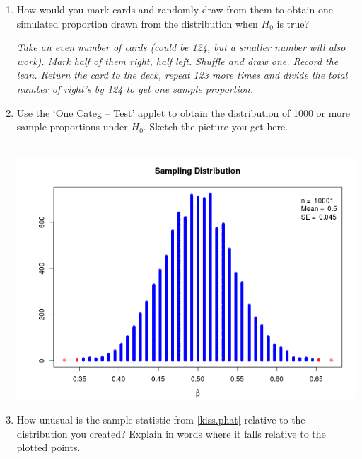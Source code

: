 \begin{enumerate}
\begin{enumerate}
\begin{enumerate}
\begin{key} 
{\it $p = .5$.  Half of all couples lean right when kissing.}
\end{key}
$H_a:$
\begin{students}
    \vspace{1cm}    \\
\end{students}
\begin{key} 
{\it $p \neq .5$.  The true proportion of couples leaning right when
  kissing is not one half.}
\end{key}
    \item How would you mark cards and randomly draw from them to
      obtain one simulated proportion drawn from the distribution when
      $H_0$ is true?
\begin{students}
    \vspace{3cm}    
\end{students}
\begin{key} 
{\it Take an even number of cards (could be 124, but a
    smaller number will also work). Mark half of them right, half
    left. Shuffle and draw one. Record the lean. Return the card
    to the deck, repeat 123 more times and divide the total number of
    right's by 124 to get one sample proportion.}
\end{key}
    \item Use the  `One Categ -- Test' applet to obtain
      the distribution of 1000 or more sample proportions under $H_0$.
      Sketch the picture you get here.
\begin{students}
    \vspace{5cm}    
\end{students}
\begin{key}
\ \  \\ \includegraphics[width=.3\linewidth]{plots/kissing-null.png}
\end{key}
  \item How unusual is the sample statistic from \ref{kiss.phat}
    relative to the distribution you created?  Explain in words where
    it falls relative to the plotted points.
\begin{students}
    \vspace{3cm}    
\end{students}


\end{enumerate}
\end{enumerate}
\end{enumerate}
